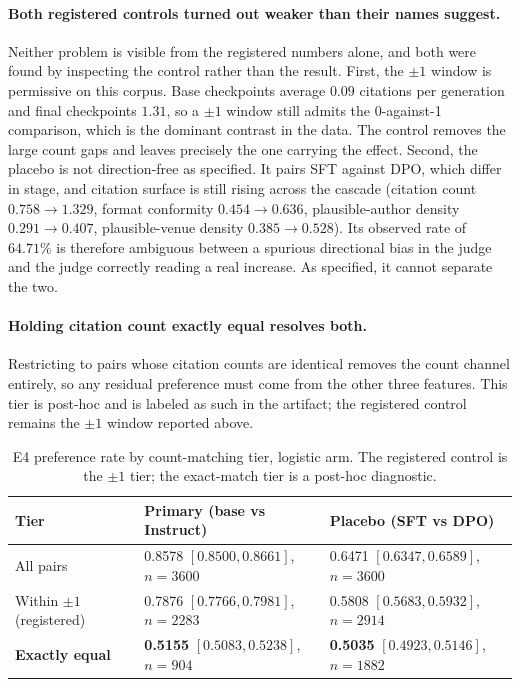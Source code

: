 \paragraph{Both registered controls turned out weaker than their names suggest.}
Neither problem is visible from the registered numbers alone, and both were
found by inspecting the control rather than the result. First, the $\pm 1$ window
is permissive on this corpus. Base checkpoints average $0.09$ citations per
generation and final checkpoints $1.31$, so a $\pm 1$ window still admits the
0-against-1 comparison, which is the dominant contrast in the data. The control
removes the large count gaps and leaves precisely the one carrying the effect.
Second, the placebo is not direction-free as specified. It pairs SFT against DPO,
which differ in stage, and citation surface is still rising across the cascade
(citation count $0.758 \to 1.329$, format conformity $0.454 \to 0.636$,
plausible-author density $0.291 \to 0.407$, plausible-venue density
$0.385 \to 0.528$). Its observed rate of $64.71\%$ is therefore ambiguous between
a spurious directional bias in the judge and the judge correctly reading a real
increase. As specified, it cannot separate the two.

\paragraph{Holding citation count exactly equal resolves both.}
Restricting to pairs whose citation counts are identical removes the count
channel entirely, so any residual preference must come from the other three
features. This tier is post-hoc and is labeled as such in the artifact; the
registered control remains the $\pm 1$ window reported above.

\begin{table}[htbp]
\centering
\small
\caption{E4 preference rate by count-matching tier, logistic arm. The registered
control is the $\pm 1$ tier; the exact-match tier is a post-hoc diagnostic.}
\label{tab:e4count}
\begin{tabular}{@{}l l l@{}}
\toprule
Tier & Primary (base vs Instruct) & Placebo (SFT vs DPO) \\
\midrule
All pairs                  & 0.8578 $[0.8500, 0.8661]$, $n = 3600$ & 0.6471 $[0.6347, 0.6589]$, $n = 3600$ \\
Within $\pm 1$ (registered) & 0.7876 $[0.7766, 0.7981]$, $n = 2283$ & 0.5808 $[0.5683, 0.5932]$, $n = 2914$ \\
\textbf{Exactly equal}     & \textbf{0.5155} $[0.5083, 0.5238]$, $n = 904$ & \textbf{0.5035} $[0.4923, 0.5146]$, $n = 1882$ \\
\bottomrule
\end{tabular}
\end{table}

